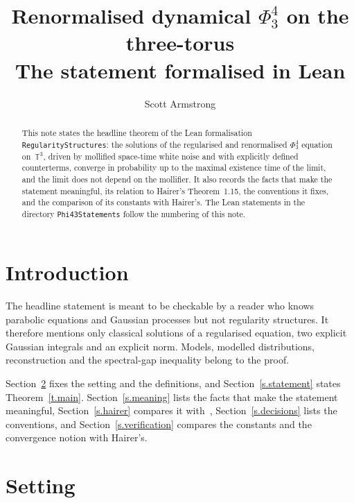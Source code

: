 \documentclass[11pt,letterpaper]{article}
\date{}
\title{Renormalised dynamical $\Phi^4_3$ on the three-torus\\[0.3em] \large The statement formalised in Lean}
\author{Scott Armstrong}
\numberwithin{equation}{section}
\theoremstyle{plain}
\theoremstyle{definition}
\theoremstyle{remark}
\newcommand{\T}{\mathbb{T}^3}
\newcommand{\1}{\mathbf{1}}
\begin{document}
\maketitle
\thispagestyle{plain}

\begin{abstract}
This note states the headline theorem of the Lean formalisation \texttt{RegularityStructures}: the solutions of the regularised and renormalised $\Phi^4_3$ equation on~$\T$, driven by mollified space-time white noise and with explicitly defined counterterms, converge in probability up to the maximal existence time of the limit, and the limit does not depend on the mollifier. It also records the facts that make the statement meaningful, its relation to Hairer's Theorem~1.15, the conventions it fixes, and the comparison of its constants with Hairer's. The Lean statements in the directory \texttt{Phi43Statements} follow the numbering of this note.
\end{abstract}


\section{Introduction}

The headline statement is meant to be checkable by a reader who knows parabolic equations and Gaussian processes but not regularity structures. It therefore mentions only classical solutions of a regularised equation, two explicit Gaussian integrals and an explicit norm. Models, modelled distributions, reconstruction and the spectral-gap inequality belong to the proof.

Section~\ref{s.setting} fixes the setting and the definitions, and Section~\ref{s.statement} states Theorem~\ref{t.main}. Section~\ref{s.meaning} lists the facts that make the statement meaningful, Section~\ref{s.hairer} compares it with~\cite[Theorem~1.15]{Hai14}, Section~\ref{s.decisions} lists the conventions, and Section~\ref{s.verification} compares the constants and the convergence notion with Hairer's.

\section{Setting}
\label{s.setting}
\end{document}
